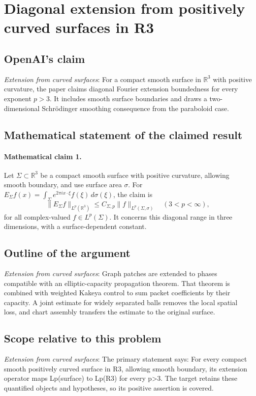 \documentclass[11pt]{article}
\begin{document}
\section*{Diagonal extension from positively curved surfaces in R3}

\subsection{OpenAI's claim}
\textit{Extension from curved surfaces}: For a compact smooth surface in $\mathbb R^3$ with positive curvature, the paper claims diagonal Fourier extension boundedness for every exponent $p>3$. It includes smooth surface boundaries and draws a two-dimensional Schrödinger smoothing consequence from the paraboloid case.

\subsection{Mathematical statement of the claimed result}
\paragraph{Mathematical claim 1.} Let $\Sigma\subset\mathbb R^3$ be a compact smooth surface with positive curvature, allowing smooth boundary, and use surface area $\sigma$. For $E_\Sigma f(x)=\int_\Sigma e^{2\pi ix\cdot\xi}f(\xi)\,d\sigma(\xi)$, the claim is \[\|E_\Sigma f\|_{L^p(\mathbb R^3)}\le C_{\Sigma,p}\|f\|_{L^p(\Sigma,\sigma)}\quad(3<p<\infty),\] for all complex-valued $f\in L^p(\Sigma)$. It concerns this diagonal range in three dimensions, with a surface-dependent constant.

\subsection{Outline of the argument}
\textit{Extension from curved surfaces}: Graph patches are extended to phases compatible with an elliptic-capacity propagation theorem. That theorem is combined with weighted Kakeya control to sum packet coefficients by their capacity. A joint estimate for widely separated balls removes the local spatial loss, and chart assembly transfers the estimate to the original surface.

\subsection{Scope relative to this problem}
\textit{Extension from curved surfaces}: The primary statement says: For every compact smooth positively curved surface in R3, allowing smooth boundary, its extension operator maps Lp(surface) to Lp(R3) for every p>3. The target retains these quantified objects and hypotheses, so its positive assertion is covered.
\end{document}
